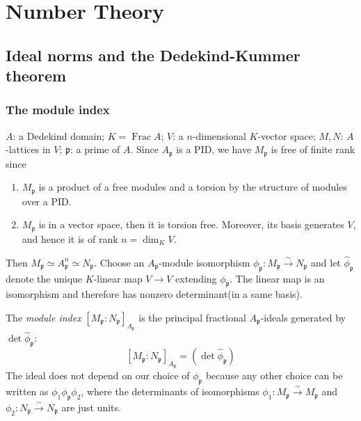 \chapter{Number Theory}

\section{Ideal norms and the Dedekind-Kummer theorem}

\subsection{The module index}

\( A \): a Dedekind domain;
\( K = \operatorname{Frac} A \);
\( V \): a \( n \)-dimensional \( K \)-vector space;
\( M, N \): \( A \)-lattices in \( V \);
\( \mathfrak{p} \): a prime of \( A \).
Since \( A_{\mathfrak{p}} \) is a PID, we have \( M_{\mathfrak{p}} \) is free of finite rank since
\begin{enumerate}
  \item \( M_{\mathfrak{p}} \) is a product of a free modules and a torsion by the structure of modules over a PID.
  \item \( M_{\mathfrak{p}} \) is in a vector space, then it is torsion free.
    Moreover, its basis generates \( V \), and hence it is of rank \( n = \operatorname{dim}_K V \).
\end{enumerate}
Then \( M_{\mathfrak{p}} \simeq A_{\mathfrak{p}}^n \simeq N_{\mathfrak{p}} \).
Choose an \( A_{\mathfrak{p}} \)-module isomorphism \( \phi_{\mathfrak{p}}: M_{\mathfrak{p}} \xrightarrow{\sim} N_{\mathfrak{p}} \) and let \( \hat{\phi}_{\mathfrak{p}} \) denote the unique \( K \)-linear map \( V \to V \) extending \( \phi_{\mathfrak{p}} \).
The linear map is an isomorphism and therefore has nonzero determinant(in a same basis).

The \emph{module index} \( [M_\mathfrak{p}: N_{\mathfrak{p}}]_{A_\mathfrak{p}} \) is the principal fractional \( A_{\mathfrak{p}} \)-ideals generated by \( \det \hat{\phi}_{\mathfrak{p}} \):
\[
  [M_{\mathfrak{p}}: N_{\mathfrak{p}}]_{A_{\mathfrak{p}}} = \left(\det \hat{\phi}_{\mathfrak{p}}\right)
\]
The ideal does not depend on our choice of \( \phi_{\mathfrak{p}} \) because any other choice can be written as \( \phi_1 \phi_{\mathfrak{p}} \phi_2 \), where the determinants of isomorphisms \( \phi_1: M_{\mathfrak{p}} \xrightarrow{\sim} M_{\mathfrak{p}} \) and \( \phi_2: N_{\mathfrak{p}} \xrightarrow{\sim} N_{\mathfrak{p}} \) are just units.

